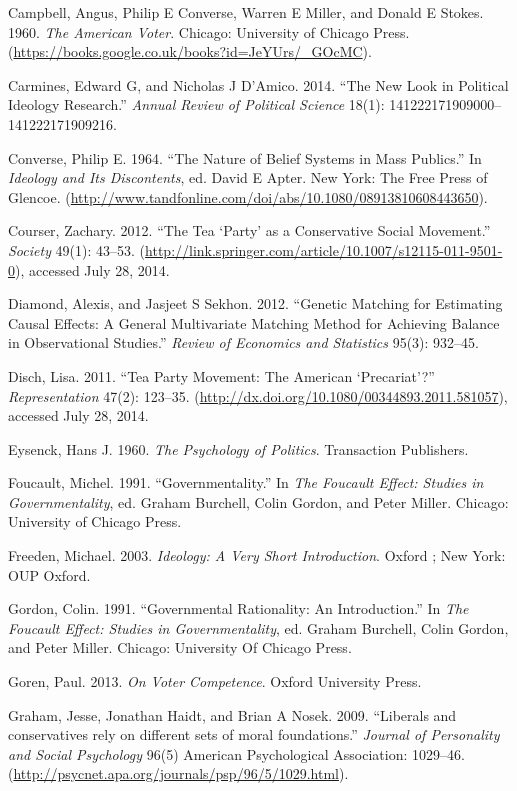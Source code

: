 \documentclass[12pt,]{article}
\begin{document}
Campbell, Angus, Philip E Converse, Warren E Miller, and Donald E
Stokes. 1960. \emph{The American Voter}. Chicago: University of Chicago
Press. (\url{https://books.google.co.uk/books?id=JeYUrs/_GOcMC}).

Carmines, Edward G, and Nicholas J D'Amico. 2014. ``The New Look in
Political Ideology Research.'' \emph{Annual Review of Political Science}
18(1): 141222171909000--141222171909216.

Converse, Philip E. 1964. ``The Nature of Belief Systems in Mass
Publics.'' In \emph{Ideology and Its Discontents}, ed. David E Apter.
New York: The Free Press of Glencoe.
(\url{http://www.tandfonline.com/doi/abs/10.1080/08913810608443650}).

Courser, Zachary. 2012. ``The Tea `Party' as a Conservative Social
Movement.'' \emph{Society} 49(1): 43--53.
(\url{http://link.springer.com/article/10.1007/s12115-011-9501-0}),
accessed July 28, 2014.

Diamond, Alexis, and Jasjeet S Sekhon. 2012. ``Genetic Matching for
Estimating Causal Effects: A General Multivariate Matching Method for
Achieving Balance in Observational Studies.'' \emph{Review of Economics
and Statistics} 95(3): 932--45.

Disch, Lisa. 2011. ``Tea Party Movement: The American `Precariat'?''
\emph{Representation} 47(2): 123--35.
(\url{http://dx.doi.org/10.1080/00344893.2011.581057}), accessed July
28, 2014.

Eysenck, Hans J. 1960. \emph{The Psychology of Politics}. Transaction
Publishers.

Foucault, Michel. 1991. ``Governmentality.'' In \emph{The Foucault
Effect: Studies in Governmentality}, ed. Graham Burchell, Colin Gordon,
and Peter Miller. Chicago: University of Chicago Press.

Freeden, Michael. 2003. \emph{Ideology: A Very Short Introduction}.
Oxford ; New York: OUP Oxford.

Gordon, Colin. 1991. ``Governmental Rationality: An Introduction.'' In
\emph{The Foucault Effect: Studies in Governmentality}, ed. Graham
Burchell, Colin Gordon, and Peter Miller. Chicago: University Of Chicago
Press.

Goren, Paul. 2013. \emph{On Voter Competence}. Oxford University Press.

Graham, Jesse, Jonathan Haidt, and Brian A Nosek. 2009. ``Liberals and
conservatives rely on different sets of moral foundations.''
\emph{Journal of Personality and Social Psychology} 96(5) American
Psychological Association: 1029--46.
(\url{http://psycnet.apa.org/journals/psp/96/5/1029.html}).
\end{document}
